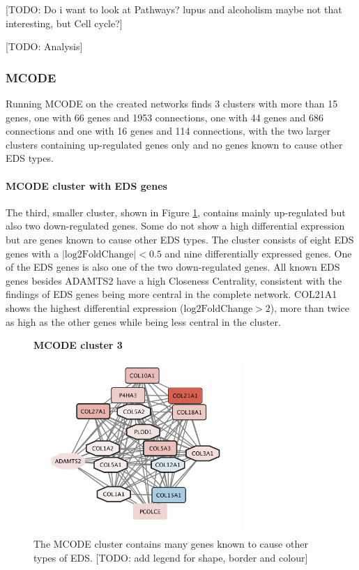 [TODO: Do i want to look at Pathways? lupus and alcoholism maybe not that interesting, but Cell cycle?]

[TODO: Analysis]

\subsubsection{MCODE}
Running MCODE on the created networks finds 3 clusters with more than 15 genes, one with 66 genes and 1953 connections, one with 44 genes and 686 connections and one with 16 genes and 114 connections, with the two larger clusters containing up-regulated genes only and no genes known to cause other EDS types. %

\paragraph{MCODE cluster with EDS genes}
The third, smaller cluster, shown in Figure \ref{fig:mcode3}, contains mainly up-regulated but also two down-regulated genes. Some do not show a high differential expression but are genes known to cause other EDS types. The cluster consists of eight EDS genes with a $|\text{log2FoldChange}| < 0.5$ and nine differentially expressed genes. One of the EDS genes is also one of the two down-regulated genes. All known EDS genes besides ADAMTS2 have a high Closeness Centrality, consistent with the findings of EDS genes being more central in the complete network. COL21A1 shows the highest differential expression ($\text{log2FoldChange} > 2$), more than twice as high as the other genes while being less central in the cluster.

\begin{figure}[htb!]
	\centering
	\caption*{\textbf{MCODE cluster 3}}
	\includegraphics[width=0.7\textwidth]{fig/MCODE-cluster3.png}
	\caption[MCODE cluster 3]{\centering The MCODE cluster contains many genes known to cause other types of EDS. [TODO: add legend for shape, border and colour]}
	\label{fig:mcode3}
\end{figure}

